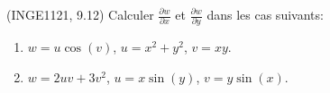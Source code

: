 
\begin{exercice}\label{exoDerrivePartielle-0003}

	(INGE1121, 9.12) Calculer $\frac{ \partial w }{ \partial x }$ et $\frac{ \partial w }{ \partial y }$ dans les cas suivants:
	\begin{enumerate}

		\item
			$w=u\cos(v)$, $u=x^2+y^2$, $v=xy$.
		\item
			$w=2uv+3v^2$, $u=x\sin(y)$, $v=y\sin(x)$.

	\end{enumerate}

\end{exercice}
